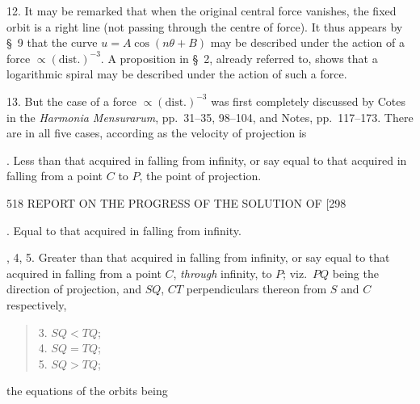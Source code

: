 \documentclass[11pt]{article}
\begin{document}
12. It may be remarked that when the original central force vanishes, the fixed orbit is a right line (not passing through the centre of force). It thus appears by \S\ 9 that the curve $u=A\cos(n\theta+B)$ may be described under the action of a force $\propto(\text{dist.})^{-3}$. A proposition in \S\ 2, already referred to, shows that a logarithmic spiral may be described under the action of such a force.

13. But the case of a force $\propto(\text{dist.})^{-3}$ was first completely discussed by Cotes in the \emph{Harmonia Mensurarum}, pp.\ 31--35, 98--104, and Notes, pp.\ 117--173. There are in all five cases, according as the velocity of projection is

. Less than that acquired in falling from infinity, or say equal to that acquired in falling from a point $C$ to $P$, the point of projection.

\begin{center}
\end{center}

\newpage
\begin{center}
518 \hfill REPORT ON THE PROGRESS OF THE SOLUTION OF \hfill [298
\end{center}

. Equal to that acquired in falling from infinity.

, 4, 5. Greater than that acquired in falling from infinity, or say equal to that acquired in falling from a point $C$, \emph{through} infinity, to $P$; viz.\ $PQ$ being the direction of projection, and $SQ$, $CT$ perpendiculars thereon from $S$ and $C$ respectively,
\begin{quote}
3. $SQ<TQ$;\\
4. $SQ=TQ$;\\
5. $SQ>TQ$;
\end{quote}
the equations of the orbits being
\end{document}
